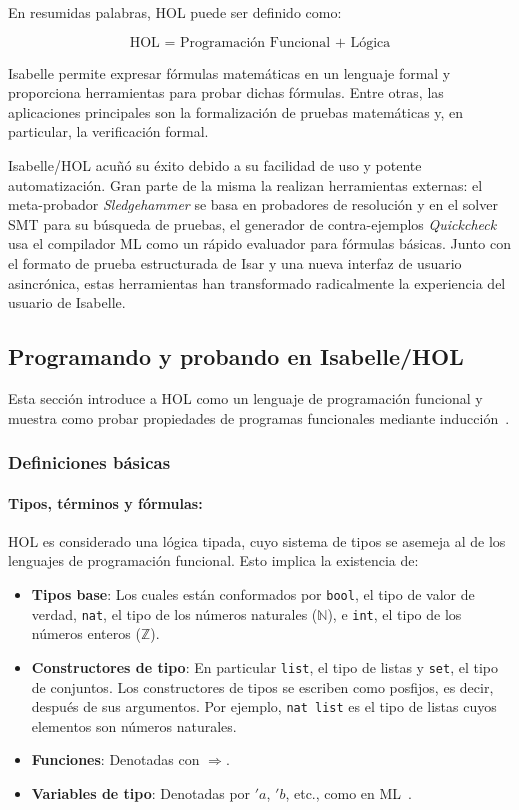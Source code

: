 \documentclass[12pt]{book}
\begin{document}
En resumidas palabras, HOL puede ser definido como:

\[ \boxed{\text{HOL = Programación Funcional + Lógica}} \]

Isabelle permite expresar fórmulas matemáticas en un lenguaje formal y proporciona herramientas para probar dichas fórmulas. Entre otras, las aplicaciones principales son la formalización de pruebas matemáticas y, en particular, la verificación formal.

Isabelle/HOL acuñó su éxito debido a su facilidad de uso y potente automatización. Gran parte de la misma la realizan herramientas externas: el meta-probador \textit{Sledgehammer} se basa en probadores de resolución y en el solver SMT para su búsqueda de pruebas, el generador de contra-ejemplos \textit{Quickcheck} usa el compilador ML como un rápido evaluador para fórmulas básicas. Junto con el formato de prueba estructurada de Isar y una nueva interfaz de usuario asincrónica, estas herramientas han transformado radicalmente la experiencia del usuario de Isabelle.

\subsection{Programando y probando en Isabelle/HOL}

Esta sección introduce a HOL como un lenguaje de programación funcional y muestra como probar propiedades de programas funcionales mediante inducción~\cite{prog-prove-isabelle}.

\subsubsection{Definiciones básicas}

\paragraph{Tipos, términos y fórmulas:}

HOL es considerado una lógica tipada, cuyo sistema de tipos se asemeja al de los lenguajes de programación funcional. Esto implica la existencia de:

\begin{itemize}
	\item \textbf{Tipos base}: Los cuales están conformados por \texttt{bool}, el tipo de valor de verdad, \texttt{nat}, el tipo de los números naturales ($\mathbb{N}$), e \texttt{int}, el tipo de los números enteros ($\mathbb{Z}$).
 	\item \textbf{Constructores de tipo}: En particular \texttt{list}, el tipo de listas y \texttt{set}, el tipo de conjuntos. Los constructores de tipos se escriben como posfijos, es decir, después de sus argumentos. Por ejemplo, \texttt{nat list} es el tipo de listas cuyos elementos son números naturales.
  	\item \textbf{Funciones}: Denotadas con $\Rightarrow$.
  	\item \textbf{Variables de tipo}: Denotadas por $'a$, $'b$, etc., como en ML~\cite{ML_programming_language}.
\end{itemize}
\end{document}
